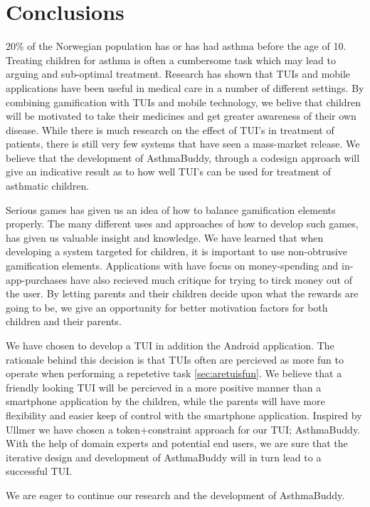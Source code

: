 \chapter{Conclusions}
\label{conclusions}

20\% of the Norwegian population has or has had asthma before the age of 10. Treating children for asthma is often a cumbersome task which may lead to arguing and sub-optimal treatment. Research has shown that TUIs and mobile applications have been useful in medical care in a number of different settings. By combining gamification with TUIs and mobile technology, we belive that children will be motivated to take their medicines and get greater awareness of their own disease. While there is much research on the effect of TUI's in treatment of patients, there is still very few systems that have seen a mass-market release. We believe that the development of AsthmaBuddy, through a codesign approach will give an indicative result as to how well TUI's can be used for treatment of asthmatic children.


Serious games has given us an idea of how to balance gamification elements properly. The many different uses and approaches of how to develop such games, has given us valuable insight and knowledge. We have learned that when developing a system targeted for children, it is important to use non-obtrusive gamification elements. Applications with have focus on money-spending and in-app-purchases have also recieved much critique for trying to tirck money out of the user. By letting parents and their children decide upon what the rewards are going to be, we give an opportunity for better motivation factors for both children and their parents. 


We have chosen to develop a TUI in addition the Android application. The rationale behind this decision is that TUIs often are percieved as more fun to operate when performing a repetetive task \ref{sec:aretuisfun}. We believe that a friendly looking TUI will be percieved in a more positive manner than a smartphone application by the children, while the parents will have more flexibility and easier keep of control with the smartphone application. Inspired by Ullmer \cite{ullmer2002tangible} we have chosen a token+constraint approach for our TUI; AsthmaBuddy. With the help of domain experts and potential end users, we are sure that the iterative design and development of AsthmaBuddy will in turn lead to a successful TUI. 

We are eager to continue our research and the development of AsthmaBuddy. 


